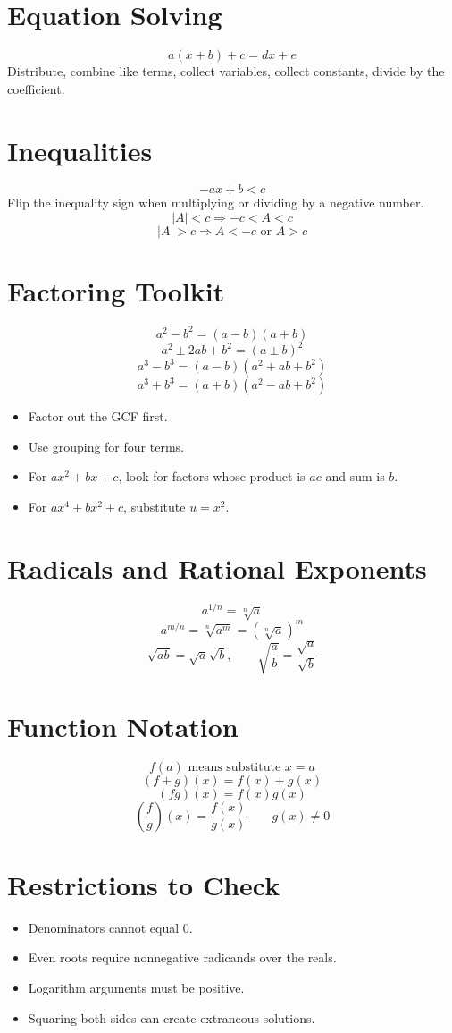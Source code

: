 \documentclass[11pt]{article}
\begin{document}

\section*{Equation Solving}
\[
a(x+b)+c=dx+e
\]
Distribute, combine like terms, collect variables, collect constants, divide by the coefficient.

\section*{Inequalities}
\[
-ax+b<c
\]
Flip the inequality sign when multiplying or dividing by a negative number.
\[
|A|<c\Rightarrow -c<A<c
\]
\[
|A|>c\Rightarrow A<-c\text{ or }A>c
\]

\section*{Factoring Toolkit}
\[
a^2-b^2=(a-b)(a+b)
\]
\[
a^2\pm2ab+b^2=(a\pm b)^2
\]
\[
a^3-b^3=(a-b)(a^2+ab+b^2)
\]
\[
a^3+b^3=(a+b)(a^2-ab+b^2)
\]
\begin{itemize}
  \item Factor out the GCF first.
  \item Use grouping for four terms.
  \item For $ax^2+bx+c$, look for factors whose product is $ac$ and sum is $b$.
  \item For $ax^4+bx^2+c$, substitute $u=x^2$.
\end{itemize}

\section*{Radicals and Rational Exponents}
\[
a^{1/n}=\sqrt[n]{a}
\]
\[
a^{m/n}=\sqrt[n]{a^m}=(\sqrt[n]{a})^m
\]
\[
\sqrt{ab}=\sqrt a\sqrt b,\qquad
\sqrt{\frac ab}=\frac{\sqrt a}{\sqrt b}
\]

\section*{Function Notation}
\[
f(a)\text{ means substitute }x=a
\]
\[
(f+g)(x)=f(x)+g(x)
\]
\[
(fg)(x)=f(x)g(x)
\]
\[
\left(\frac fg\right)(x)=\frac{f(x)}{g(x)}\qquad g(x)\ne0
\]

\section*{Restrictions to Check}
\begin{itemize}
  \item Denominators cannot equal $0$.
  \item Even roots require nonnegative radicands over the reals.
  \item Logarithm arguments must be positive.
  \item Squaring both sides can create extraneous solutions.
\end{itemize}
\end{document}
